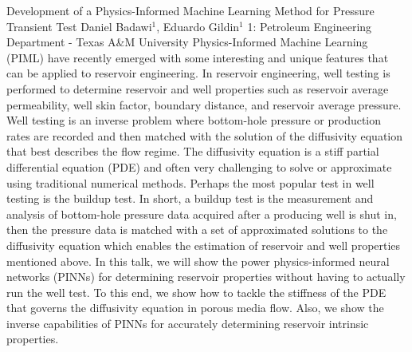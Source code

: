 \vspace{1.5ex}
\abs
{Development of a Physics-Informed Machine Learning Method for Pressure Transient Test}
{Daniel Badawi$^1$, Eduardo Gildin$^1$}
{1: Petroleum Engineering Department - Texas A\&M University}
{Physics-Informed Machine Learning (PIML) have recently emerged with some interesting and unique features that can be applied to reservoir engineering. In reservoir engineering, well testing  is performed to determine reservoir and well properties such as reservoir average permeability, well skin factor, boundary distance, and reservoir average pressure. Well testing is an inverse problem where bottom-hole pressure or production rates are recorded and then matched with the solution of the diffusivity equation that best describes the flow regime. The diffusivity equation is a stiff partial differential equation (PDE) and often very challenging to solve or approximate using traditional numerical methods. Perhaps the most popular test in well testing is the buildup test. In short, a buildup test is the measurement and analysis of bottom-hole pressure data acquired after a producing well is shut in, then the pressure data is matched with a set of approximated solutions to the diffusivity equation which enables the estimation of reservoir and well properties mentioned above. In this talk, we will show the power physics-informed neural networks (PINNs) for determining reservoir properties without having to actually run the well test. To this end, we  show how to tackle the stiffness of the PDE that governs the diffusivity equation in porous media flow. Also, we show the inverse capabilities of PINNs for accurately determining reservoir intrinsic properties.}


